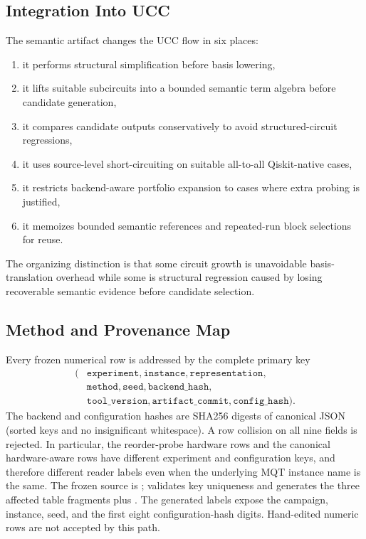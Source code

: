 \subsection{Integration Into UCC}
\label{sec:integration}

The semantic artifact changes the UCC flow in six places:
\begin{enumerate}[leftmargin=1.5em]
    \item it performs structural simplification before basis lowering,
    \item it lifts suitable subcircuits into a bounded semantic term algebra before candidate generation,
    \item it compares candidate outputs conservatively to avoid structured-circuit regressions,
    \item it uses source-level short-circuiting on suitable all-to-all Qiskit-native cases,
    \item it restricts backend-aware portfolio expansion to cases where extra probing is justified,
    \item it memoizes bounded semantic references and repeated-run block selections for reuse.
\end{enumerate}

The organizing distinction is that some circuit growth is unavoidable
basis-translation overhead while some is structural regression caused by
losing recoverable semantic evidence before candidate selection.

\subsection{Method and Provenance Map}
\label{app:method-provenance}

Every frozen numerical row is addressed by the complete primary key
\begin{equation*}
\begin{split}
(&\texttt{experiment},\texttt{instance},\texttt{representation},\\
 &\texttt{method},\texttt{seed},\texttt{backend\_hash},\\
 &\texttt{tool\_version},\texttt{artifact\_commit},
  \texttt{config\_hash}).
\end{split}
\end{equation*}
The backend and configuration hashes are SHA256 digests of canonical JSON
(sorted keys and no insignificant whitespace).  A row collision on all nine
fields is rejected.  In particular, the reorder-probe hardware rows and the
canonical hardware-aware rows have different experiment and configuration
keys, and therefore different reader labels even when the underlying MQT
instance name is the same.  The frozen source is
;
 validates key uniqueness and generates
the three affected table fragments plus
.  The generated labels expose the campaign,
instance, seed, and the first eight configuration-hash digits.  Hand-edited
numeric rows are not accepted by this path.

